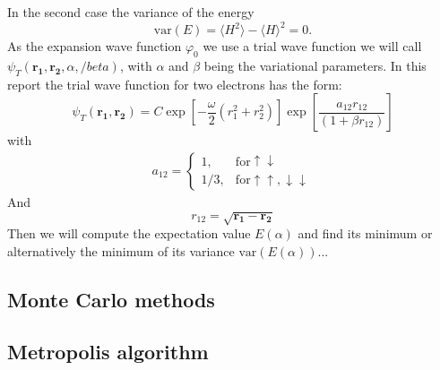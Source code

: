 In the second case the variance of the energy
\begin{equation}
\mathrm{var}(E) = \langle H^2 \rangle - \langle H\rangle^2 = 0.
\end{equation}
As the expansion wave function $\varphi_0$ we use a trial wave function we will call $\psi_T (\mathbf{r_1, r_2},\alpha, /beta)$, with $\alpha$ and $\beta$ being the variational parameters. In this report the trial wave function for two electrons has the form:
\begin{equation}
\psi_T(\mathbf{r_1,r_2}) = C \exp\left[-\frac{\omega}{2} (r_1^2+r_2^2)\right] \exp \left[ \frac{a_{12} r_{12}}{(1+\beta r_{12})} \right]
\end{equation}
with
\begin{align}
a_{12} =\left\{\begin{array}{cl} 1, & \mbox{for} \uparrow\downarrow\\ 1/3, & \mbox{for} \uparrow\uparrow,\downarrow\downarrow \end{array}\right.
\end{align}
And
\begin{equation}
r_{12} = \sqrt{\mathbf{r_1} - \mathbf{r_2}}
\end{equation}
 Then we will compute the expectation value $E(\alpha)$ and find its minimum or alternatively the minimum of its variance $\mathrm{var}(E(\alpha))$...
\subsection{Monte Carlo methods}
\subsection{Metropolis algorithm}